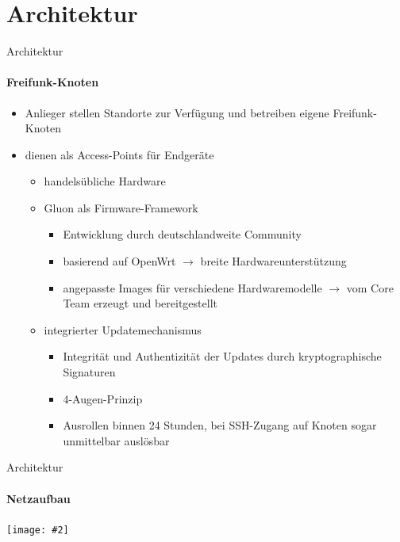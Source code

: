 \documentclass{beamer}
\newcommand{\centeredimage}[2][ ]{
        \begin{center}
            \texttt{[image: \#2]} $\;$

            \tiny{#1}
        \end{center}
}
\begin{document}
\section{Architektur}
\begin{frame}{Architektur}
\framesubtitle{Freifunk-Knoten}
\begin{itemize}
	\item Anlieger stellen Standorte zur Verfügung und betreiben eigene Freifunk-Knoten
	\item dienen als Access-Points für Endgeräte
	\begin{itemize}
		\item handelsübliche Hardware
		\item Gluon als Firmware-Framework
		\begin{itemize}
			\item Entwicklung durch deutschlandweite Community
			\item basierend auf OpenWrt $\rightarrow$ breite Hardwareunterstützung
			\item angepasste Images für verschiedene Hardwaremodelle \newline $\rightarrow$ vom Core Team erzeugt und bereitgestellt
		\end{itemize}
		\item integrierter Updatemechanismus
		\begin{itemize}
			\item Integrität und Authentizität der Updates durch kryptographische Signaturen
			\item 4-Augen-Prinzip
			\item Ausrollen binnen 24 Stunden, bei SSH-Zugang auf Knoten sogar unmittelbar auslösbar
		\end{itemize}
	\end{itemize}
\end{itemize}
\end{frame}


\begin{frame}{Architektur}
\framesubtitle{Netzaufbau}
\centeredimage{images/network_layout}
\end{frame}
\end{document}
